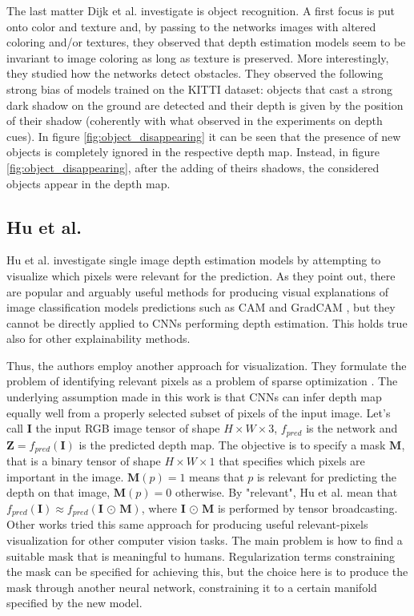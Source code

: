 The last matter Dijk et al. investigate is object recognition.
A first focus is put onto color and texture and, by passing to the networks images with altered coloring and/or textures, they observed that depth estimation models seem to be invariant to image coloring as long as texture is preserved.
More interestingly, they studied how the networks detect obstacles.
They observed the following strong bias of models trained on the KITTI dataset: objects that cast a strong dark shadow on the ground are detected and their depth is given by the position of their shadow (coherently with what observed in the experiments on depth cues).
In figure \ref{fig:object_disappearing} it can be seen that the presence of new objects is completely ignored in the respective depth map.
Instead, in figure \ref{fig:object_disappearing}, after the adding of theirs shadows, the considered objects appear in the depth map.

\subsection{Hu et al.}
Hu et al. \cite{Hu} investigate single image depth estimation models by attempting to visualize which pixels were relevant for the prediction.
As they point out, there are popular and arguably useful methods for producing visual explanations of image classification models predictions such as CAM \cite{CAM} and GradCAM \cite{GradCAM}, but they cannot be directly applied to CNNs performing depth estimation.
This holds true also for other explainability methods.

Thus, the authors employ another approach for visualization.
They formulate the problem of identifying relevant pixels as a problem of sparse optimization \cite{Hu}.
The underlying assumption made in this work is that  CNNs can infer depth map equally well from a properly selected subset of pixels of the input image.
Let's call $\mathbf{I}$ the input RGB image tensor of shape $H \times W \times 3$, $f_{pred}$ is the network and $\mathbf{Z} = f_{pred} ( \mathbf{I} )$ is the predicted depth map.
The objective is to specify a mask $\mathbf{M}$, that is a binary tensor of shape $H \times W \times 1$ that specifies which pixels are important in the image.
$\mathbf{M}(p) = 1$ means that $p$ is relevant for predicting the depth on that image, $\mathbf{M}(p) = 0$ otherwise.
By "relevant", Hu et al. mean that $f_{pred} (\mathbf{I}) \approx f_{pred} (\mathbf{I} \, \odot \, \mathbf{M})$, where $\mathbf{I} \, \odot \, \mathbf{M}$ is performed by tensor broadcasting.
Other works tried this same approach for producing useful relevant-pixels visualization for other computer vision tasks.
The main problem is how to find a suitable mask that is meaningful to humans.
Regularization terms constraining the mask can be specified for achieving this, but the choice here is to produce the mask through another neural network, constraining it to a certain manifold specified by the new model.

